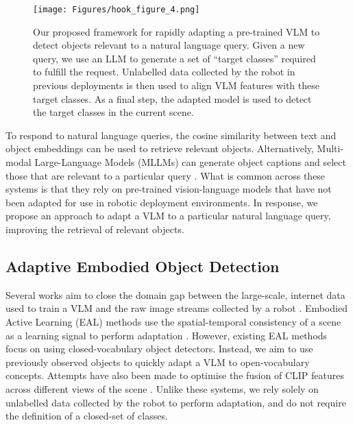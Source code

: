 \begin{figure}[!t]
\centering
\texttt{[image: Figures/hook\_figure\_4.png]}
\caption{Our proposed framework for rapidly adapting a pre-trained VLM to detect objects relevant to a natural language query. Given a new query, we use an LLM to generate a set of ``target classes'' required to fulfill the request. Unlabelled data collected by the robot in previous deployments is then used to align VLM features with these target classes. As a final step, the adapted model is used to detect the target classes in the current scene.
}
\vspace{-1.5em}
\label{simple_method}
\end{figure}

To respond to natural language queries, the cosine similarity between text and object embeddings can be used to retrieve relevant objects. Alternatively, Multi-modal Large-Language Models (MLLMs) \cite{llava, llava3d} can generate object captions and select those that are relevant to a particular query \cite{conceptgraphs}. What is common across these systems is that they rely on pre-trained vision-language models that have not been adapted for use in robotic deployment environments. In response, we propose an approach to adapt a VLM to a particular natural language query, improving the retrieval of relevant objects.

\subsection{Adaptive Embodied Object Detection}
Several works aim to close the domain gap between the large-scale, internet data used to train a VLM and the raw image streams collected by a robot \cite{seal}. Embodied Active Learning (EAL) methods use the spatial-temporal consistency of a scene as a learning signal to perform adaptation \cite{seal, eal_semseg, self_improving, move_to_see}. However, existing EAL methods focus on using closed-vocabulary object detectors. Instead, we aim to use previously observed objects to quickly adapt a VLM to open-vocabulary concepts. Attempts have also been made to optimise the fusion of CLIP features across different views of the scene \cite{ovoslam, bare, eod}. Unlike these systems, we rely solely on unlabelled data collected by the robot to perform adaptation, and do not require the definition of a closed-set of classes. 


